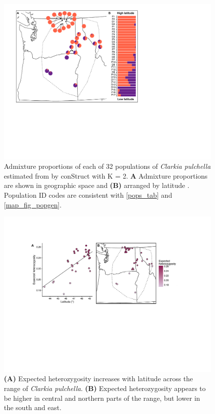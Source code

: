 \documentclass{article}
\begin{document}
\begin{figure}[p]
\centering
\includegraphics[width=15cm]{figs/construct_main_fig.pdf}
\caption[Admixture proportions of each of 32 populations of \textit{Clarkia pulchella}]{Admixture proportions of each of 32 populations of \textit{Clarkia pulchella} estimated from by conStruct with K = 2. \textbf{A} Admixture proportions are shown in geographic space and \textbf{(B)} arranged by latitude . Population ID codes are consistent with \autoref{pops_tab} and \autoref{map_fig_popgen}.}
\label{construct_main}
\end{figure}

\clearpage

\begin{figure}[p]
\centering
\includegraphics[width=16cm]{figs/het_map.pdf}
\caption[Expected heterozygosity across the range of \textit{Clarkia pulchella}]{\textbf{(A)} Expected heterozygosity increases with latitude across the range of \textit{Clarkia pulchella}. \textbf{(B)} Expected heterozygosity appears to be higher in central and northern parts of the range, but lower in the south and east.}
\label{het_map}
\end{figure}
\end{document}
